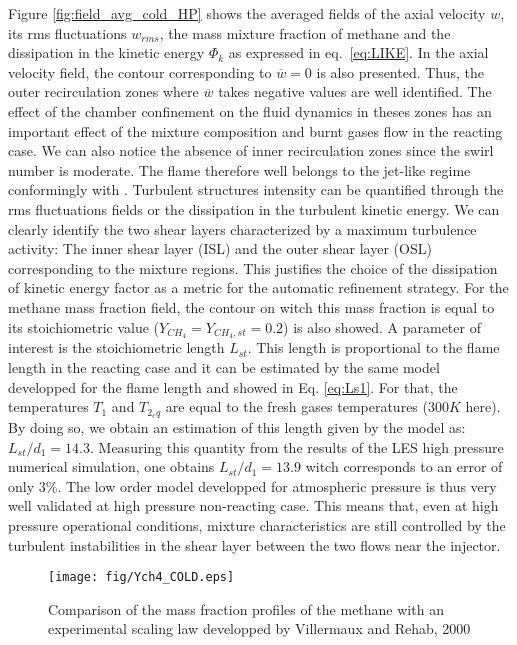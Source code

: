 \documentclass[twocolumn,10pt]{asme2e}
\begin{document}
Figure \ref{fig:field_avg_cold_HP} shows the averaged fields of the axial velocity $w$, its rms fluctuations $w_{rms}$, the mass mixture fraction of methane and the dissipation in the kinetic energy $\Phi_k$ as expressed in eq.~\ref{eq:LIKE}. In the axial velocity field, the contour corresponding to $\overline{w} = 0$ is also presented. Thus, the outer recirculation zones where $\overline{w}$ takes negative values are well identified. The effect of the chamber confinement on the fluid dynamics in theses zones has an important effect of the mixture composition and burnt gases flow in the reacting case. We can also notice the absence of inner recirculation zones since the swirl number is moderate. The flame therefore well belongs to the jet-like regime conformingly with \cite{chen1990comparison}. Turbulent structures intensity can be quantified through the rms fluctuations fields or the dissipation in the turbulent kinetic energy. We can clearly identify the two shear layers characterized by a maximum turbulence activity: The inner shear layer (ISL) and the outer shear layer (OSL) corresponding to the mixture regions. This justifies the choice of the dissipation of kinetic energy factor as a metric for the automatic refinement strategy. For the methane mass fraction field, the contour on witch this mass fraction is equal to its stoichiometric value ($Y_{CH_4}=Y_{CH_4,st}=0.2$) is also showed. A parameter of interest is the stoichiometric length $L_{st}$. This length is proportional to the flame length in the reacting case and it can be estimated by the same model developped for the flame length and showed in Eq. \ref{eq:Ls1}. For that, the temperatures $T_1$ and $T_{2_eq}$ are equal to the fresh gases temperatures ($300K$ here). By doing so, we obtain an estimation of this length given by the model as: $L_{st}/d_1=14.3$. Measuring this quantity from the results of the LES high pressure numerical simulation, one obtains  $L_{st}/d_1=13.9$ witch corresponds to an error of only 3\%. The low order model developped for atmospheric pressure is thus very well validated at high pressure non-reacting case. This means that, even at high pressure operational conditions, mixture characteristics are still controlled by the turbulent instabilities in the shear layer between the two flows near the injector. 

\begin{figure}
       \centering
       \texttt{[image: fig/Ych4\_COLD.eps]}
      \caption{Comparison of the mass fraction profiles of the methane with an experimental scaling law developped by Villermaux and Rehab, 2000 \cite{villermaux2000mixing} }
   \label{fig:profiles_Ych4_COLDHP}
   \vspace{-0.05 cm}
\end{figure}
\end{document}
